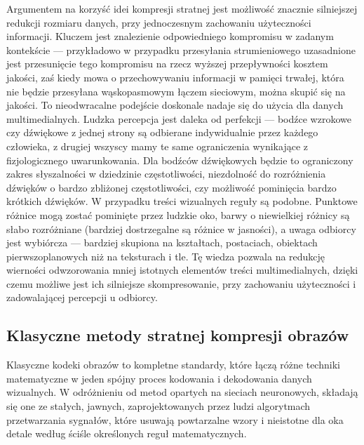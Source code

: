 Argumentem na korzyść idei kompresji stratnej jest możliwość znacznie silniejszej redukcji rozmiaru danych, przy jednoczesnym zachowaniu użyteczności informacji. Kluczem jest znalezienie odpowiedniego kompromisu w zadanym kontekście --- przykładowo w przypadku przesyłania strumieniowego uzasadnione jest przesunięcie tego kompromisu na rzecz wyższej przepływności kosztem jakości, zaś kiedy mowa o przechowywaniu informacji w pamięci trwałej, która nie będzie przesyłana wąskopasmowym łączem sieciowym, można skupić się na jakości. To nieodwracalne podejście doskonale nadaje się do użycia dla danych multimedialnych. Ludzka percepcja jest daleka od perfekcji --- bodźce wzrokowe czy dźwiękowe z jednej strony są odbierane indywidualnie przez każdego człowieka, z drugiej wszyscy mamy te same ograniczenia wynikające z fizjologicznego uwarunkowania. Dla bodźców dźwiękowych będzie to ograniczony zakres słyszalności w dziedzinie częstotliwości, niezdolność do rozróżnienia dźwięków o bardzo zbliżonej częstotliwości, czy możliwość pominięcia bardzo krótkich dźwięków. W przypadku treści wizualnych reguły są podobne. Punktowe różnice mogą zostać pominięte przez ludzkie oko, barwy o niewielkiej różnicy są słabo rozróżniane (bardziej dostrzegalne są różnice w jasności), a uwaga odbiorcy jest wybiórcza --- bardziej skupiona na kształtach, postaciach, obiektach pierwszoplanowych niż na teksturach i tle. Tę wiedza pozwala na redukcję wierności odwzorowania mniej istotnych elementów treści multimedialnych, dzięki czemu możliwe jest ich silniejsze skompresowanie, przy zachowaniu użyteczności i zadowalającej percepcji u odbiorcy.

\subsection{Klasyczne metody stratnej kompresji obrazów}
Klasyczne kodeki obrazów to kompletne standardy, które łączą różne techniki matematyczne w jeden spójny proces kodowania i dekodowania danych wizualnych. W odróżnieniu od metod opartych na sieciach neuronowych, składają się one ze stałych, jawnych, zaprojektowanych przez ludzi algorytmach przetwarzania sygnałów, które usuwają powtarzalne wzory i nieistotne dla oka detale według ściśle określonych reguł matematycznych.
